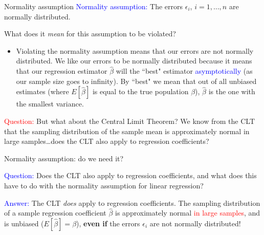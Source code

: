 \documentclass[10pt,t]{beamer}
\begin{document}
\begin{frame}{Normality assumption}
\textcolor{blue}{Normality assumption:} The errors $\epsilon_i$, $i = 1, \dots, n$ are normally distributed.

\vspace{0.3cm}

What does it \textit{mean} for this assumption to be violated?

\vspace{0.3cm}

\begin{itemize}
	\item[] Violating the normality assumption means that our errors are not normally distributed. We like our errors to be normally distributed because it means that our regression estimator $\hat{\beta}$ will the ``best" estimator \textcolor{blue}{asymptotically} (as our sample size goes to infinity). By ``best" we mean that out of all unbiased estimates (where $E[\hat{\beta}]$ is equal to the true population $\beta$), $\hat{\beta}$ is the one with the smallest variance.
\end{itemize}

\vspace{0.3cm} 
\textcolor{red}{Question:} But what about the Central Limit Theorem? We know from the CLT that the sampling distribution of the sample mean is approximately normal in large samples\dots does the CLT also apply to regression coefficients?

\end{frame}

\begin{frame}{Normality assumption: do we need it?}

\textcolor{blue}{Question:} Does the CLT also apply to regression coefficients, and what does this have to do with the normality assumption for linear regression?

\vspace{0.3cm} 

\textcolor{blue}{Answer:} The CLT \textit{does} apply to regression coefficients. The sampling distribution of a sample regression coefficient $\hat{\beta}$ is approximately normal \textcolor{red}{in large samples}, and is unbiased ($E[\hat{\beta}] = \beta$), \textbf{even if} the errors $\epsilon_i$ are not normally distributed!


\end{frame}
\end{document}
